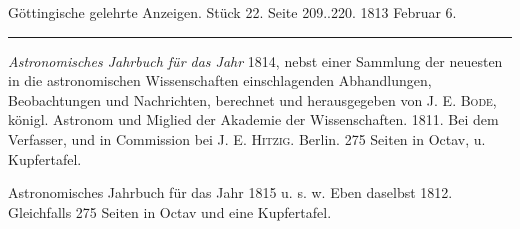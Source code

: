 \clearpage
{}
\hypertarget{native-553-lower}{}\label{native-553-lower}
\begin{center}\small Göttingische gelehrte Anzeigen. Stück 22. Seite 209..220. 1813 Februar 6.\\[3pt]\rule{.72\linewidth}{.3pt}\end{center}

\emph{Astronomisches Jahrbuch für das Jahr} 1814, nebst einer Sammlung der neuesten in die astronomischen Wissenschaften einschlagenden Abhandlungen, Beobachtungen und Nachrichten, berechnet und herausgegeben von J. E. \textsc{Bode}, königl. Astronom und Miglied der Akademie der Wissenschaften. 1811. Bei dem Verfasser, und in Commission bei J. E. \textsc{Hitzig}. Berlin. 275 Seiten in Octav, u. Kupfertafel.

Astronomisches Jahrbuch für das Jahr 1815 u. s. w. Eben daselbst 1812. Gleichfalls 275 Seiten in Octav und eine Kupfertafel.

